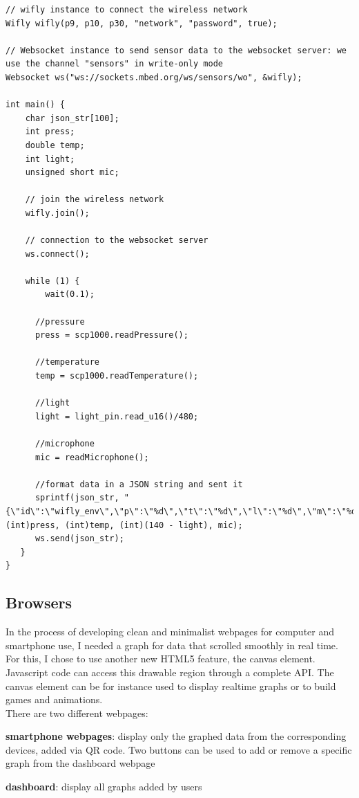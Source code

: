 \documentclass[pdftex,10pt,a4paper]{report}
\newenvironment{packed_item}{
\begin{itemize}
  \setlength{\itemsep}{1pt}
  \setlength{\parskip}{0pt}
  \setlength{\parsep}{0pt}
}{\end{itemize}}
\begin{document}
\begin{center}
\begin{lstlisting}[label=Streaming data code example,caption=Streaming data code example]
// wifly instance to connect the wireless network
Wifly wifly(p9, p10, p30, "network", "password", true);

// Websocket instance to send sensor data to the websocket server: we use the channel "sensors" in write-only mode
Websocket ws("ws://sockets.mbed.org/ws/sensors/wo", &wifly);

int main() {
    char json_str[100];
    int press;
    double temp;
    int light;
    unsigned short mic;
    
    // join the wireless network
    wifly.join();
    		
    // connection to the websocket server
    ws.connect();
    		
    while (1) {
    	wait(0.1);

      //pressure
      press = scp1000.readPressure();

      //temperature
      temp = scp1000.readTemperature();

      //light
      light = light_pin.read_u16()/480;

      //microphone
      mic = readMicrophone();

      //format data in a JSON string and sent it
      sprintf(json_str, "{\"id\":\"wifly_env\",\"p\":\"%d\",\"t\":\"%d\",\"l\":\"%d\",\"m\":\"%d\"}", (int)press, (int)temp, (int)(140 - light), mic);
      ws.send(json_str);
   }
}
\end{lstlisting}
\end{center}



\subsection{Browsers}
In the process of developing clean and minimalist webpages for computer and smartphone use, I needed a graph for data that scrolled smoothly in real time. For this, I chose to use another new HTML5 feature, the canvas element. Javascript code can access this drawable region through a complete API. The canvas element can be for instance used to display realtime graphs or to build games and animations.
\\


There are two different webpages:
\begin{packed_item}
	\item \textbf{smartphone webpages}: display only the graphed data from the corresponding devices, added via QR code. Two buttons can be used to add or remove a specific graph from the dashboard webpage
	\item \textbf{dashboard}: display all graphs added by users
\end{packed_item}
\end{document}
